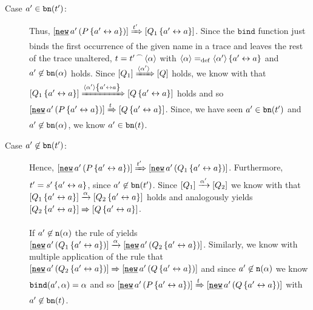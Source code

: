 \begin{prf}
\begin{description}
\begin{description}
\item[Case $a'\in\mathtt{bn}(t')$:] Thus, $\ec{\procres[()]{a'}{P\transp{a'}{a}}}\bigstep{t'}\ec{Q_1\transp{a'}{a}}$. Since the $\texttt{bind}$ function just binds the first occurrence of the given name in a trace and leaves the rest of the trace unaltered, $t={t'}^{\,\frown{}\,}{\langle\alpha\rangle}$ with $\langle\alpha\rangle=_{\mathrm{def}}\langle\alpha'\rangle\left\{a'\leftrightarrow{}a\right\}$ and $a'\not\in\mathtt{bn}(\alpha)$ holds. Since $\left[Q_1\right]\xRightarrow{\langle\alpha'\rangle}\left[Q\right]$ holds, we know with  that $\left[Q_1\left\{a'\leftrightarrow{}a\right\}\right]\xRightarrow{\langle\alpha'\rangle\left\{a'\leftrightarrow{}a\right\}}\left[Q\left\{a'\leftrightarrow{}a\right\}\right]$ holds and so $\ec{\procres[()]{a'}{P\transp{a'}{a}}}\bigstep{t}\ec{Q\transp{a'}{a}}$. Since, we have seen $a'\in\mathtt{bn}(t')$ and $a'\not\in\mathtt{bn}(\alpha)$, we know $a'\in\mathtt{bn}(t)$.

\item[Case $a'\not\in\mathtt{bn}(t')$:] Hence, $\ec{\procres[()]{a'}{P\transp{a'}{a}}}\bigstep{t'}\ec{\procres[()]{a'}{Q_1\transp{a'}{a}}}$. Furthermore, $t'=s'\left\{a'\leftrightarrow{}a\right\}$, since $a'\not\in\mathtt{bn}(t')$. Since $\left[Q_1\right]\xrightarrow{\alpha'}\left[Q_2\right]$ we know with  that $\left[Q_1\left\{a'\leftrightarrow{}a\right\}\right]\xrightarrow{\alpha}\left[Q_2\left\{a'\leftrightarrow{}a\right\}\right]$ holds and analogously  yields $\left[Q_2\left\{a'\leftrightarrow{}a\right\}\right]\xRightarrow{}\left[Q\left\{a'\leftrightarrow{}a\right\}\right]$.

If $a'\not\in\mathtt{n}(\alpha)$ the \eres{} rule of  yields $\ec{\procres[()]{a'}{Q_1\transp{a'}{a}}}\transs{\alpha}\ec{\procres[()]{a'}{Q_2\transp{a'}{a}}}$. Similarly, we know with multiple application of the \eres{} rule that $\ec{\procres[()]{a'}{Q_2\transp{a'}{a}}}\bigstep{}\ec{\procres[()]{a'}{Q\transp{a'}{a}}}$ and since $a'\not\in\mathtt{n}(\alpha)$ we know $\mathtt{bind}(a',\alpha)=\alpha$ and so $\ec{\procres[()]{a'}{P\transp{a'}{a}}}\bigstep{t}\ec{\procres[()]{a'}{Q\transp{a'}{a}}}$ with $a'\not\in\mathtt{bn}(t)$.


\end{description}
\end{description}
\end{prf}
